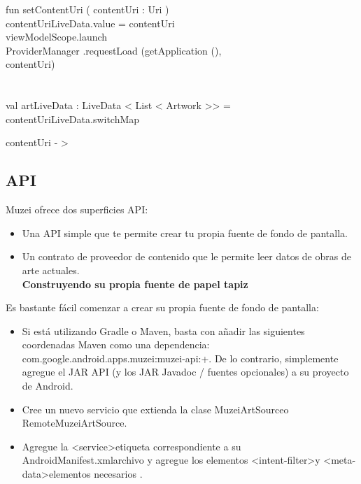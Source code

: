 \documentclass[12pt,a4paper]{article}
\begin{document}
    fun  setContentUri ( contentUri :  Uri ) {\\
        contentUriLiveData.value = contentUri\\
        viewModelScope.launch {\\
            ProviderManager .requestLoad (getApplication (),\\ contentUri)\\
        }\\
    }\\

    val artLiveData :  LiveData < List < Artwork >> = contentUriLiveData.switchMap {contentUri - >
    
    
    
  
\subsection{API}
Muzei ofrece dos superficies API:\\
\begin{itemize}
\item Una API simple que te permite crear tu propia fuente de fondo de pantalla.\\
\item Un contrato de proveedor de contenido que le permite leer datos de obras de arte actuales.\\
\textbf{Construyendo su propia fuente de papel tapiz}\\
\end{itemize}





Es bastante fácil comenzar a crear su propia fuente de fondo de pantalla:\\
\begin{itemize}
\item Si está utilizando Gradle o Maven, basta con añadir las siguientes coordenadas Maven como una dependencia: com.google.android.apps.muzei:muzei-api:+. De lo contrario, simplemente agregue el JAR API (y los JAR Javadoc / fuentes opcionales) a su proyecto de Android.\\
\item Cree un nuevo servicio que extienda la clase MuzeiArtSourceo RemoteMuzeiArtSource.\\
\item Agregue la <service>etiqueta correspondiente a su AndroidManifest.xmlarchivo y agregue los elementos <intent-filter>y <meta-data>elementos necesarios .\\
\end{itemize}




}
\end{document}
